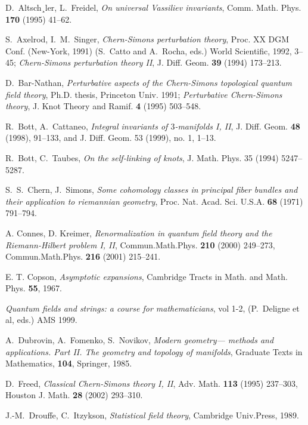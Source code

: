 \documentclass[10pt]{amsart}
\theoremstyle{definition}
\theoremstyle{remark}
\begin{document}
\begin{thebibliography}{99}

 D.~Altsch¸ler, L.~Freidel, {\em On universal
Vassiliev invariants}, Comm. Math. Phys. {\bf 170} (1995) 41--62.

 S.~Axelrod, I.~M.~Singer, {\em Chern-Simons
perturbation theory}, Proc. XX DGM Conf. (New-York, 1991)
(S.~Catto and A.~Rocha, eds.) World Scientific, 1992, 3--45;
{\em Chern-Simons perturbation theory II}, J. Diff. Geom.
{\bf 39} (1994) 173--213.

 D.~Bar-Nathan, {\em Perturbative aspects of the
Chern-Simons topological quantum field theory}, Ph.D. thesis,
Princeton Univ. 1991; {\em Perturbative Chern-Simons theory},
J. Knot Theory and Ramif. {\bf 4} (1995) 503--548.

 R.~Bott, A.~Cattaneo, {\em Integral invariants
of $3$-manifolds I, II}, J. Diff. Geom. {\bf 48} (1998),
91--133, and J. Diff. Geom. 53 (1999), no. 1, 1--13.

 R.~Bott, C.~Taubes, {\em On the self-linking of
knots}, J. Math. Phys. 35 (1994) 5247--5287.

 S.~S.~Chern, J.~Simons, {\em Some cohomology classes
in principal fiber bundles and their application to riemannian
geometry}, Proc. Nat. Acad. Sci. U.S.A. {\bf 68} (1971) 791--794.

 A. Connes, D. Kreimer, {\em Renormalization in
quantum field theory and the Riemann-Hilbert problem I, II},
Commun.Math.Phys. {\bf 210} (2000) 249--273, Commun.Math.Phys.
{\bf 216} (2001) 215--241.

 E. T. Copson, {\em Asymptotic
expansions}, Cambridge Tracts in Math. and Math. Phys. {\bf 55},
1967.

 {\em Quantum fields and strings: a course for
mathematicians}, vol 1-2, (P.~Deligne et al, eds.) AMS 1999.

 A.~Dubrovin, A.~Fomenko, S.~Novikov, {\em Modern
geometry--- methods and applications. Part II. The geometry and
topology of manifolds}, Graduate Texts in Mathematics, {\bf 104},
Springer, 1985.

 D.~Freed, {\em Classical Chern-Simons theory I, II},
Adv. Math. {\bf 113} (1995) 237--303, Houston J. Math. {\bf 28}
(2002) 293--310.

 J.-M.~Drouffe, C.~Itzykson, {\em Statistical field
theory}, Cambridge Univ.Press, 1989.


\end{thebibliography}
\end{document}
